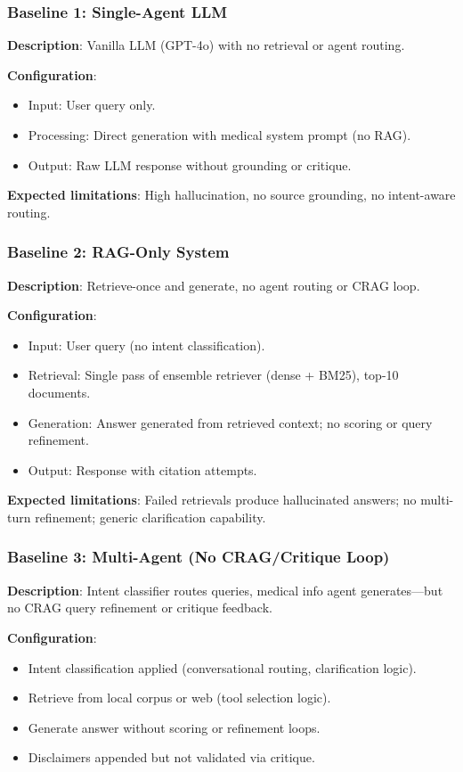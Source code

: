 \documentclass[11pt,a4paper]{article}
\begin{document}
\subsubsection{Baseline 1: Single-Agent LLM}
\textbf{Description}: Vanilla LLM (GPT-4o) with no retrieval or agent routing.

\textbf{Configuration}:
\begin{itemize}
    \item Input: User query only.
    \item Processing: Direct generation with medical system prompt (no RAG).
    \item Output: Raw LLM response without grounding or critique.
\end{itemize}

\textbf{Expected limitations}: High hallucination, no source grounding, no intent-aware routing.

\subsubsection{Baseline 2: RAG-Only System}
\textbf{Description}: Retrieve-once and generate, no agent routing or CRAG loop.

\textbf{Configuration}:
\begin{itemize}
    \item Input: User query (no intent classification).
    \item Retrieval: Single pass of ensemble retriever (dense + BM25), top-10 documents.
    \item Generation: Answer generated from retrieved context; no scoring or query refinement.
    \item Output: Response with citation attempts.
\end{itemize}

\textbf{Expected limitations}: Failed retrievals produce hallucinated answers; no multi-turn refinement; generic clarification capability.

\subsubsection{Baseline 3: Multi-Agent (No CRAG/Critique Loop)}
\textbf{Description}: Intent classifier routes queries, medical info agent generates---but no CRAG query refinement or critique feedback.

\textbf{Configuration}:
\begin{itemize}
    \item Intent classification applied (conversational routing, clarification logic).
    \item Retrieve from local corpus or web (tool selection logic).
    \item Generate answer without scoring or refinement loops.
    \item Disclaimers appended but not validated via critique.
\end{itemize}
\end{document}

